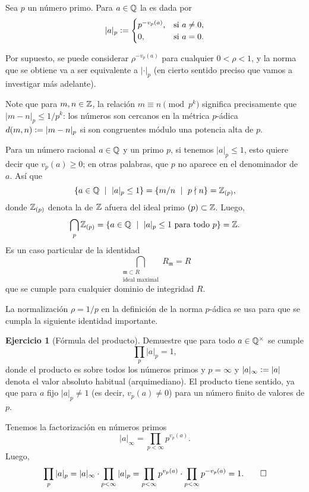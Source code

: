 \documentclass{article}
\numberwithin{equation}{section}
\theoremstyle{definition}
\newtheorem{ejerc}{Ejercicio}
\begin{document}
\begin{definicion}
  \label{def:norma-p-adica}
  Sea $p$ un número primo. Para $a\in \mathbb{Q}$ la  es dada por
  $$|a|_p \mathrel{\mathop:}= \begin{cases}
    p^{-v_p (a)}, & \text{si }a \ne 0,\\
    0, & \text{si }a = 0.
  \end{cases}$$
\end{definicion}

Por supuesto, se puede considerar $\rho^{-v_p (a)}$ para cualquier
$0 < \rho < 1$, y la norma que se obtiene va a ser equivalente a $|\cdot|_p$
(en cierto sentido preciso que vamos a investigar más adelante).

Note que para $m,n\in \mathbb{Z}$, la relación $m\equiv n \pmod{p^k}$ significa
precisamente que $|m - n|_p \le 1/p^k$: los números son cercanos en la métrica
$p$-ádica $d (m,n) \mathrel{\mathop:}= |m - n|_p$ si son congruentes módulo una potencia alta
de $p$.

Para un número racional $a\in \mathbb{Q}$ y un primo $p$, si tenemos $|a|_p \le 1$,
esto quiere decir que $v_p (a) \ge 0$; en otras palabras, que $p$ no aparece en
el denominador de $a$. Así que
$$\{ a\in\mathbb{Q} ~\mid~ |a|_p \le 1 \} = \{ m/n ~\mid~ p\nmid n \} = \mathbb{Z}_{(p)},$$
donde $\mathbb{Z}_{(p)}$ denota la  de $\mathbb{Z}$ afuera del ideal primo
$(p) \subset \mathbb{Z}$. Luego,
$$\bigcap_p \mathbb{Z}_{(p)} = \{ a\in\mathbb{Q} ~\mid~ |a|_p \le 1 \text{ para todo }p \} = \mathbb{Z}.$$
Es un caso particular de la identidad
$$\bigcap_{\substack{\mathfrak{m}\subset R \\ \text{ideal maximal}}} R_\mathfrak{m} = R$$
que se cumple para cualquier dominio de integridad $R$.

\vspace{1em}

La normalización $\rho = 1/p$ en la definición de la norma $p$-ádica se usa para
que se cumpla la siguiente identidad importante.

\begin{ejerc}[Fórmula del producto]
  Demuestre que para todo $a\in \mathbb{Q}^\times$ se cumple
  $$\prod_p |a|_p = 1,$$
  donde el producto es sobre todos los números primos y $p = \infty$
  y $|a|_\infty \mathrel{\mathop:}= |a|$ denota el valor absoluto habitual (arquimediano).
  El producto tiene sentido, ya que para $a$ fijo $|a|_p \ne 1$
  (es decir, $v_p (a) \ne 0$) para un número finito de valores de $p$.

  \ifdefined\solutions\begin{solucion}
    Tenemos la factorización en números primos
    $$|a|_\infty = \prod_{p < \infty} p^{v_p (a)}.$$
    Luego,
    \[ \prod_p |a|_p =
       |a|_\infty \cdot \prod_{p < \infty} |a|_p =
       \prod_{p < \infty} p^{v_p (a)} \cdot \prod_{p < \infty} p^{-v_p (a)}
       = 1. \qedhere \]
  \end{solucion}\fi
\end{ejerc}
\end{document}

